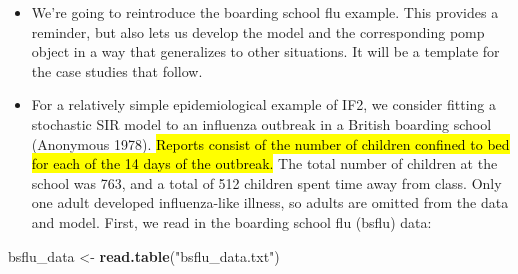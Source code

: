 \documentclass[]{article}
\newenvironment{Shaded}{\begin{snugshade}}{\end{snugshade}}
\newcommand{\KeywordTok}[1]{\textcolor[rgb]{0.13,0.29,0.53}{\textbf{#1}}}
\newcommand{\StringTok}[1]{\textcolor[rgb]{0.31,0.60,0.02}{#1}}
\newcommand{\NormalTok}[1]{#1}
\begin{document}
\begin{itemize}
\item
  We're going to reintroduce the boarding school flu example. This
  provides a reminder, but also lets us develop the model and the
  corresponding pomp object in a way that generalizes to other
  situations. It will be a template for the case studies that follow.
\item
  For a relatively simple epidemiological example of IF2, we consider
  fitting a stochastic SIR model to an influenza outbreak in a British
  boarding school (Anonymous 1978). \hl{Reports consist of the number of
  children confined to bed for each of the 14 days of the outbreak.} The
  total number of children at the school was 763, and a total of 512
  children spent time away from class. Only one adult developed
  influenza-like illness, so adults are omitted from the data and model.
  First, we read in the boarding school flu (bsflu) data:
\end{itemize}

\begin{Shaded}
\begin{Highlighting}[]
\NormalTok{bsflu_data <-}\StringTok{ }\KeywordTok{read.table}\NormalTok{(}\StringTok{"bsflu_data.txt"}\NormalTok{)}
\end{Highlighting}
\end{Shaded}
\end{document}
